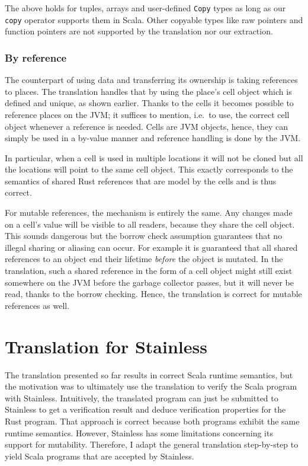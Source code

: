 The above holds for tuples, arrays and user-defined \lstinline!Copy! types as
long as our \lstinline!copy! operator supports them in Scala. Other copyable
types like raw pointers and function pointers are not supported by the
translation nor our extraction.

\subsubsection{By reference}

The counterpart of using data and transferring its ownership is taking
references to places. The translation handles that by using the place's cell
object which is defined and unique, as shown earlier. Thanks to the cells it
becomes possible to reference places on the JVM; it suffices to mention, i.e.~to
use, the correct cell object whenever a reference is needed. Cells are JVM
objects, hence, they can simply be used in a by-value manner and reference
handling is done by the JVM.

In particular, when a cell is used in multiple locations it will not be cloned
but all the locations will point to the same cell object. This exactly
corresponds to the semantics of shared Rust references that are model by the
cells and is thus correct.

For mutable references, the mechanism is entirely the same. Any changes made on
a cell's value will be visible to all readers, because they share the cell
object. This sounds dangerous but the borrow check assumption guarantees that no
illegal sharing or aliasing can occur. For example it is guaranteed that all
shared references to an object end their lifetime \emph{before} the object is
mutated. In the translation, such a shared reference in the form of a cell
object might still exist somewhere on the JVM before the garbage collector
passes, but it will never be read, thanks to the borrow checking. Hence, the
translation is correct for mutable references as well.



\section{Translation for Stainless}

The translation presented so far results in correct Scala runtime semantics, but
the motivation was to ultimately use the translation to verify the Scala program
with Stainless. Intuitively, the translated program can just be submitted to
Stainless to get a verification result and deduce verification properties for
the Rust program. That approach is correct because both programs exhibit the
same runtime semantics. However, Stainless has some limitations concerning its
support for mutability. Therefore, I adapt the general translation step-by-step
to yield Scala programs that are accepted by Stainless.


